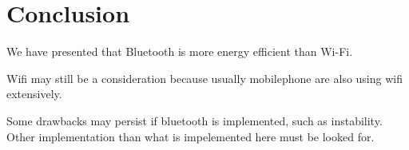 \documentclass[journal]{vgtc}                %
\begin{document}
\section{Conclusion} %
\label{sec:conclusion}
We have presented that Bluetooth is more energy efficient than Wi-Fi.

Wifi may still be a consideration because usually mobilephone are also using wifi extensively.

Some drawbacks may persist if bluetooth is implemented, such as instability. Other implementation than what is impelemented here must be looked for.





\end{document}
